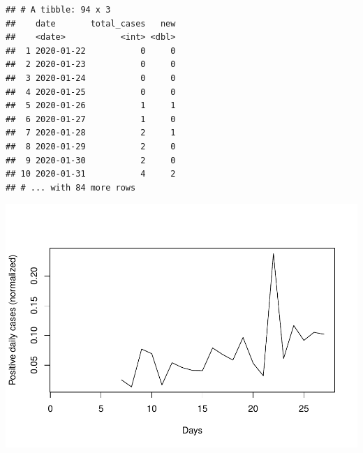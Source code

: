 \documentclass[]{article}
\newenvironment{Shaded}{\begin{snugshade}}{\end{snugshade}}
\newcommand{\CommentTok}[1]{\textcolor[rgb]{0.56,0.35,0.01}{\textit{#1}}}
\newcommand{\DataTypeTok}[1]{\textcolor[rgb]{0.13,0.29,0.53}{#1}}
\newcommand{\KeywordTok}[1]{\textcolor[rgb]{0.13,0.29,0.53}{\textbf{#1}}}
\newcommand{\NormalTok}[1]{#1}
\newcommand{\OperatorTok}[1]{\textcolor[rgb]{0.81,0.36,0.00}{\textbf{#1}}}
\newcommand{\StringTok}[1]{\textcolor[rgb]{0.31,0.60,0.02}{#1}}
\begin{document}
\begin{verbatim}
## # A tibble: 94 x 3
##    date       total_cases   new
##    <date>           <int> <dbl>
##  1 2020-01-22           0     0
##  2 2020-01-23           0     0
##  3 2020-01-24           0     0
##  4 2020-01-25           0     0
##  5 2020-01-26           1     1
##  6 2020-01-27           1     0
##  7 2020-01-28           2     1
##  8 2020-01-29           2     0
##  9 2020-01-30           2     0
## 10 2020-01-31           4     2
## # ... with 84 more rows
\end{verbatim}

\begin{Shaded}
\end{Shaded}

\includegraphics{Covid19Canada_files/figure-latex/unnamed-chunk-4-1.pdf}
\end{document}
